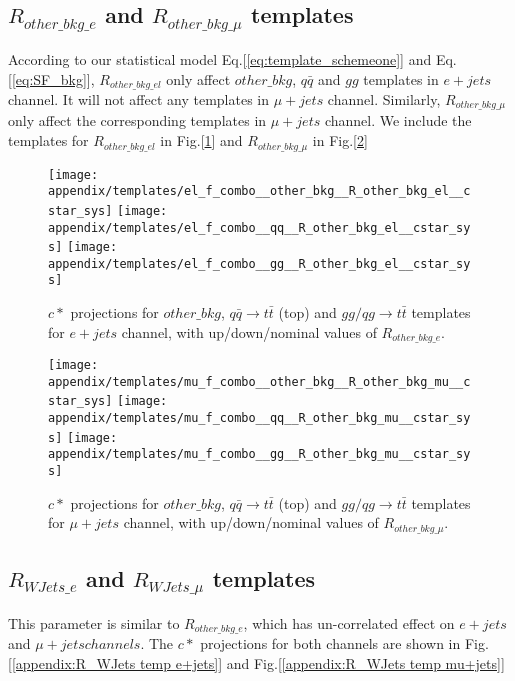 \documentclass{cmspaperpdf}
\begin{document}
\subsection{ $R_{other\_bkg\_e}$ and $R_{other\_bkg\_\mu}$ templates }
According to our statistical model Eq.[\ref{eq:template_schemeone}] and Eq.[\ref{eq:SF_bkg}], $R_{other\_bkg\_el}$ only affect $other\_bkg$, $q\bar q$ and $gg$ templates in $e+jets$ channel. It will not affect any templates in $\mu+jets$ channel. Similarly, $R_{other\_bkg\_\mu}$ only affect the corresponding templates in $\mu+jets$ channel. We include the templates for $R_{other\_bkg\_el}$ in Fig.[\ref{appendix:R_other_bkg temp e+jets}] and $R_{other\_bkg\_\mu}$ in Fig.[\ref{appendix:R_other_bkg temp mu+jets}]

\begin{figure}[hbt]
  \begin{center}
    \texttt{[image: appendix/templates/el\_f\_combo\_\_other\_bkg\_\_R\_other\_bkg\_el\_\_cstar\_sys]}
    \texttt{[image: appendix/templates/el\_f\_combo\_\_qq\_\_R\_other\_bkg\_el\_\_cstar\_sys]}
    \texttt{[image: appendix/templates/el\_f\_combo\_\_gg\_\_R\_other\_bkg\_el\_\_cstar\_sys]}
  \caption{\small $c*$ projections for $other\_bkg$,  $q\bar q \rightarrow t\bar t$ (top) and $gg/qg \rightarrow t\bar t$ templates for $e+jets$ channel, with up/down/nominal values of $R_{other\_bkg\_e}$.}
  \label{appendix:R_other_bkg temp e+jets}
  \end{center}
\end{figure}

\begin{figure}[hbt]
  \begin{center}
    \texttt{[image: appendix/templates/mu\_f\_combo\_\_other\_bkg\_\_R\_other\_bkg\_mu\_\_cstar\_sys]}
    \texttt{[image: appendix/templates/mu\_f\_combo\_\_qq\_\_R\_other\_bkg\_mu\_\_cstar\_sys]}
    \texttt{[image: appendix/templates/mu\_f\_combo\_\_gg\_\_R\_other\_bkg\_mu\_\_cstar\_sys]}
  \caption{\small $c*$ projections for $other\_bkg$,  $q\bar q \rightarrow t\bar t$ (top) and $gg/qg \rightarrow t\bar t$ templates for $\mu+jets$ channel, with up/down/nominal values of $R_{other\_bkg\_\mu}$.}
  \label{appendix:R_other_bkg temp mu+jets}
  \end{center}
\end{figure}

\subsection{$R_{WJets\_e}$ and $R_{WJets\_\mu}$ templates}
This parameter is similar to $R_{other\_bkg\_e}$, which has un-correlated effect on $e+jets$ and $\mu+jets channels$. The $c*$ projections for both channels are shown in Fig.[\ref{appendix:R_WJets temp e+jets}] and Fig.[\ref{appendix:R_WJets temp mu+jets}] 
\end{document}

